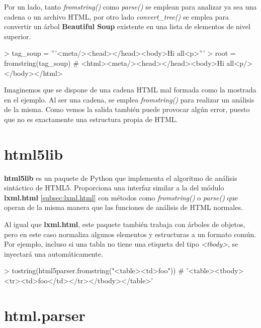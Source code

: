 Por un lado, tanto \emph{fromstring()} como \emph{parse()} se emplean para analizar ya sea una cadena o un 
archivo HTML, por otro lado \emph{convert\_tree()} se emplea para convertir un árbol \textbf{Beautiful Soup} 
existente en una lista de elementos de nivel superior.

\begin{Schunk}
    \begin{Soutput}
        > tag_soup = '''<meta/><head></head><body>Hi all<p>'''
        > root = fromstring(tag_soup)
        # <html><meta/><head></head><body>Hi all<p/></body></html>
    \end{Soutput}
\end{Schunk}

Imaginemos que se dispone de una cadena HTML mal formada como la mostrada en el ejemplo. Al ser una cadena,
se emplea \emph{fromstring()} para realizar un análisis de la misma. Como vemos la salida también puede
provocar algún error, puesto que no es exactamente una estructura propia de HTML.

\section{html5lib}
\label{sec:html5lib}

\textbf{html5lib} \cite{html5lib} es un paquete de Python que implementa el algoritmo de análisis sintáctico 
de HTML5. Proporciona una interfaz similar a la del módulo \textbf{lxml.html} \ref{subsec:lxml.html} con 
métodos como \emph{fromstring()} o \emph{parse()} que operan de la misma manera que las funciones de análisis 
de HTML normales.

Al igual que \textbf{lxml.html}, este paquete también trabaja con árboles de objetos, pero en este caso 
normaliza algunos elementos y estructuras a un formato común. Por ejemplo, incluso si una tabla no tiene 
una etiqueta del tipo \emph{<tbody>}, se inyectará una automáticamente.

\begin{Schunk}
    \begin{Soutput}
        > tostring(html5parser.fromstring("<table><td>foo"))
        # '<table><tbody><tr><td>foo</td></tr></tbody></table>'
    \end{Soutput}
\end{Schunk}

\section{html.parser}
\label{sec:html.parser}

